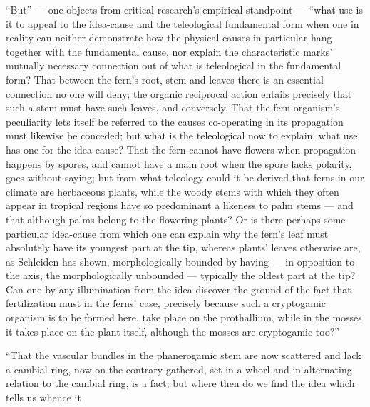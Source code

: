 \documentclass[12pt,a4paper]{book}
\begin{document}
``But'' --- one objects from critical research's empirical standpoint --- ``what
use is it to appeal to the idea-cause and the teleological fundamental form when
one
in reality can neither demonstrate how the physical causes in particular hang
together with the fundamental cause, nor explain the characteristic marks'
mutually necessary connection out of what is teleological in the fundamental form?
That between the fern's root, stem and leaves there is an essential connection no
one will deny; the organic reciprocal action entails precisely that such a stem
must have such leaves, and conversely. That the fern organism's peculiarity lets
itself be referred to the causes co-operating in its propagation must likewise be
conceded; but what is the teleological now to explain, what use has one for the
idea-cause? That the fern cannot have flowers when propagation happens by spores,
and cannot have a main root when the spore lacks polarity, goes without saying;
but from what teleology could it be derived that ferns in our climate are
herbaceous plants, while the woody stems with which they often appear in tropical
regions have so predominant a likeness to palm stems --- and that although palms
belong to the flowering plants? Or is there perhaps some particular idea-cause
from which one can explain why the fern's leaf must absolutely have its youngest
part at the tip, whereas plants' leaves otherwise are, as Schleiden has shown,
morphologically bounded by having --- in opposition to the axis, the morphologically
unbounded --- typically the oldest part at the tip? Can one by any illumination
from the idea discover the ground of the fact that fertilization must in the ferns'
case, precisely because such a cryptogamic organism is to be formed here, take
place on the prothallium, while in the mosses it takes place on the plant itself,
although the mosses are cryptogamic too?''

``That the vascular bundles in the phanerogamic stem are now scattered and lack a
cambial ring, now on the contrary gathered, set in a whorl and in alternating
relation to the cambial ring, is a fact; but where then do we find the idea which
tells us whence it
\end{document}
